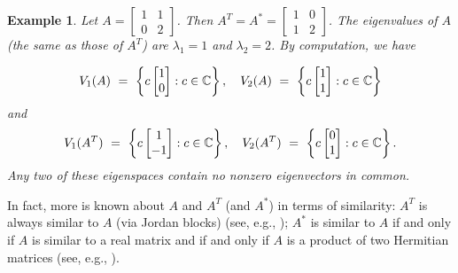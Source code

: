 \documentclass{article}
\newtheorem{exa}{Example}
\begin{document}
\begin{exa}\rm
 Let  $A=\begin{bmatrix} 1 & 1 \\0 & 2\end{bmatrix}$. Then
$A^T=A^*=\begin{bmatrix} 1 & 0 \\1 & 2\end{bmatrix}$.
The eigenvalues of $A$ (the same as those of $A^T$)  are
$\lambda_1=1$ and $\lambda_2=2$. By computation, we have

$$V_{1}(A)\ = \ \left \{ c \begin{bmatrix} 1 \\ 0\end{bmatrix} : c\in \Bbb C\right  \}, \quad
V_{2}(A)\ = \ \left  \{ c \begin{bmatrix} 1 \\ 1 \end{bmatrix} : c\in \Bbb C\right \} $$
and
$$V_{1}(A^T)\ = \ \left \{ c \begin{bmatrix} 1 \\ -1\end{bmatrix} : c\in \Bbb C\right  \}, \quad
V_{2}(A^T) \ = \ \left  \{ c \begin{bmatrix} 0 \\ 1 \end{bmatrix} : c\in \Bbb C\right \}.$$
Any two of these eigenspaces contain no nonzero eigenvectors in common.
\end{exa}

In fact, more  is known about $A$ and $A^T$ (and $A^*$) in terms of similarity:
$A^T$ is always similar to $A$ (via Jordan blocks) (see, e.g.,
\cite[Theorem\,3.5.1, p.\,153]{Zh});  $A^*$ is similar to $A$ if and only if
$A$ is similar to a real matrix and if and only if $A$ is a product of two Hermitian matrices
(see,   e.g., \cite[Theorem\,8.2.2, p.\,351]{Zh}).
\medskip

\end{document}
